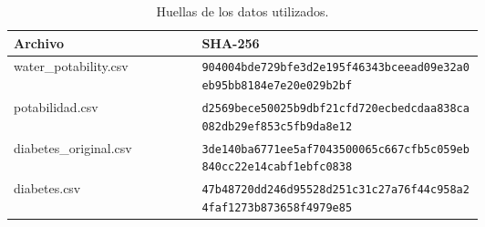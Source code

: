 \documentclass[11pt]{article}
\begin{document}
\begin{table}[H]\centering\small
\caption{Huellas de los datos utilizados.}
\begin{tabular}{lp{0.6\linewidth}}\toprule
Archivo & SHA-256 \\ \midrule
water\_\allowbreak{}potability.csv & {\footnotesize\texttt{904004bde729bfe3d2e195f46343bcee}\newline\texttt{ad09e32a0eb95bb8184e7e20e029b2bf}} \\
potabilidad.csv & {\footnotesize\texttt{d2569bece50025b9dbf21cfd720ecbed}\newline\texttt{cdaa838ca082db29ef853c5fb9da8e12}} \\
diabetes\_\allowbreak{}original.csv & {\footnotesize\texttt{3de140ba6771ee5af7043500065c667c}\newline\texttt{fb5c059eb840cc22e14cabf1ebfc0838}} \\
diabetes.csv & {\footnotesize\texttt{47b48720dd246d95528d251c31c27a76}\newline\texttt{f44c958a24faf1273b873658f4979e85}} \\
\bottomrule\end{tabular}
\end{table}
\end{document}
